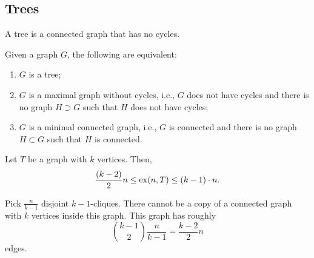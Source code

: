 \subsection{Trees}

\begin{defn}[Tree]
	A tree is a connected graph that has no cycles.
\end{defn}

\begin{prop}
	Given a graph $G$, the following are equivalent:
	\begin{enumerate}
		\item $G$ is a tree;
		\item $G$ is a maximal graph without cycles, i.e., $G$ does not have cycles and there is no graph $H \supset G$ such that $H$ does not have cycles; 
		\item $G$ is a minimal connected graph, i.e., $G$ is connected and there is no graph $H \subset G$ such that $H$ is connected.
	\end{enumerate}
\end{prop}

\begin{thm}
	Let $T$ be a graph with $k$ vertices. Then, \[
		\frac{(k-2)}{2}n \le \operatorname{ex}(n, T) \le (k - 1) \cdot n.
	\]
\end{thm}

\begin{dem}
	Pick $\frac{n}{k-1}$ disjoint $k-1$-cliques. There cannot be a copy of a connected graph with $k$ vertices inside this graph. This graph has roughly \[
		\binom{k-1}{2}\frac{n}{k-1} = \frac{k-2}{2} n
	\] edges.
\end{dem}\

